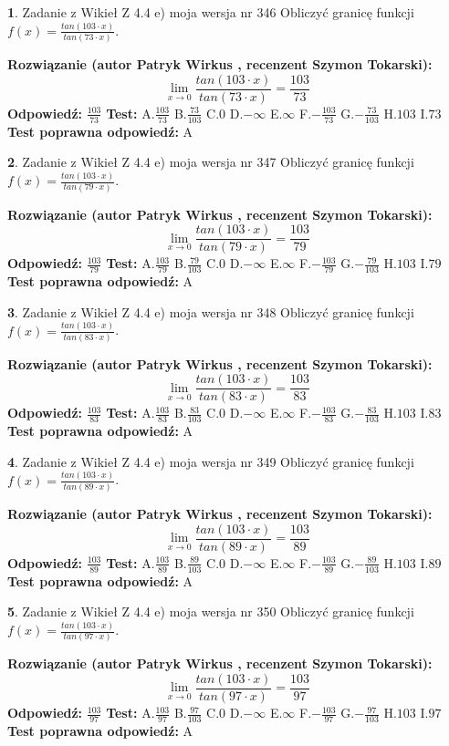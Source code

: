 \documentclass[12pt, a4paper]{article}
\theoremstyle{definition} %
\newtheorem{zad}{}
\newcommand{\zadStart}[1]{\begin{zad}#1\newline}
\newcommand{\zadStop}{\end{zad}}
\newcommand{\rozwStart}[2]{\noindent \textbf{Rozwiązanie (autor #1 , recenzent #2): }\newline}
\newcommand{\rozwStop}{\newline}
\newcommand{\odpStart}{\noindent \textbf{Odpowiedź:}\newline}
\newcommand{\odpStop}{\newline}
\newcommand{\testStart}{\noindent \textbf{Test:}\newline}
\newcommand{\testStop}{\newline}
\newcommand{\kluczStart}{\noindent \textbf{Test poprawna odpowiedź:}\newline}
\newcommand{\kluczStop}{\newline}
\begin{document}
\zadStart{Zadanie z Wikieł Z 4.4 e) moja wersja nr 346}
Obliczyć granicę funkcji $f(x)=\frac{tan(103\cdot x)}{tan(73\cdot x)}$.
\zadStop
\rozwStart{Patryk Wirkus}{Szymon Tokarski}
$$\lim\limits_{x\to 0}\frac{tan(103\cdot x)}{tan(73\cdot x)}=
\frac{103}{73}$$
\rozwStop
\odpStart
$\frac{103}{73}$
\odpStop
\testStart
A.$\frac{103}{73}$
B.$\frac{73}{103}$
C.$0$
D.$-\infty$
E.$\infty$
F.$-\frac{103}{73}$
G.$-\frac{73}{103}$
H.$103$
I.$73$
\testStop
\kluczStart
A
\kluczStop



\zadStart{Zadanie z Wikieł Z 4.4 e) moja wersja nr 347}
Obliczyć granicę funkcji $f(x)=\frac{tan(103\cdot x)}{tan(79\cdot x)}$.
\zadStop
\rozwStart{Patryk Wirkus}{Szymon Tokarski}
$$\lim\limits_{x\to 0}\frac{tan(103\cdot x)}{tan(79\cdot x)}=
\frac{103}{79}$$
\rozwStop
\odpStart
$\frac{103}{79}$
\odpStop
\testStart
A.$\frac{103}{79}$
B.$\frac{79}{103}$
C.$0$
D.$-\infty$
E.$\infty$
F.$-\frac{103}{79}$
G.$-\frac{79}{103}$
H.$103$
I.$79$
\testStop
\kluczStart
A
\kluczStop



\zadStart{Zadanie z Wikieł Z 4.4 e) moja wersja nr 348}
Obliczyć granicę funkcji $f(x)=\frac{tan(103\cdot x)}{tan(83\cdot x)}$.
\zadStop
\rozwStart{Patryk Wirkus}{Szymon Tokarski}
$$\lim\limits_{x\to 0}\frac{tan(103\cdot x)}{tan(83\cdot x)}=
\frac{103}{83}$$
\rozwStop
\odpStart
$\frac{103}{83}$
\odpStop
\testStart
A.$\frac{103}{83}$
B.$\frac{83}{103}$
C.$0$
D.$-\infty$
E.$\infty$
F.$-\frac{103}{83}$
G.$-\frac{83}{103}$
H.$103$
I.$83$
\testStop
\kluczStart
A
\kluczStop



\zadStart{Zadanie z Wikieł Z 4.4 e) moja wersja nr 349}
Obliczyć granicę funkcji $f(x)=\frac{tan(103\cdot x)}{tan(89\cdot x)}$.
\zadStop
\rozwStart{Patryk Wirkus}{Szymon Tokarski}
$$\lim\limits_{x\to 0}\frac{tan(103\cdot x)}{tan(89\cdot x)}=
\frac{103}{89}$$
\rozwStop
\odpStart
$\frac{103}{89}$
\odpStop
\testStart
A.$\frac{103}{89}$
B.$\frac{89}{103}$
C.$0$
D.$-\infty$
E.$\infty$
F.$-\frac{103}{89}$
G.$-\frac{89}{103}$
H.$103$
I.$89$
\testStop
\kluczStart
A
\kluczStop



\zadStart{Zadanie z Wikieł Z 4.4 e) moja wersja nr 350}
Obliczyć granicę funkcji $f(x)=\frac{tan(103\cdot x)}{tan(97\cdot x)}$.
\zadStop
\rozwStart{Patryk Wirkus}{Szymon Tokarski}
$$\lim\limits_{x\to 0}\frac{tan(103\cdot x)}{tan(97\cdot x)}=
\frac{103}{97}$$
\rozwStop
\odpStart
$\frac{103}{97}$
\odpStop
\testStart
A.$\frac{103}{97}$
B.$\frac{97}{103}$
C.$0$
D.$-\infty$
E.$\infty$
F.$-\frac{103}{97}$
G.$-\frac{97}{103}$
H.$103$
I.$97$
\testStop
\kluczStart
A
\kluczStop
\end{document}
